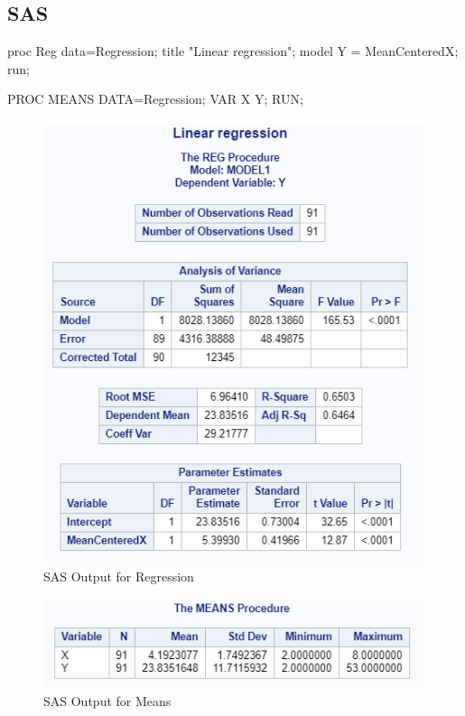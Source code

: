\documentclass[
]{book}
\newenvironment{Shaded}{\begin{snugshade}}{\end{snugshade}}
\newcommand{\NormalTok}[1]{#1}
\newcommand{\StringTok}[1]{\textcolor[rgb]{0.31,0.60,0.02}{#1}}
\begin{document}
\hypertarget{sas-1}{%
\subsection{SAS}\label{sas-1}}

\begin{Shaded}
\begin{Highlighting}[]
\NormalTok{proc Reg data=Regression;}
\NormalTok{title }\StringTok{"Linear regression"}\NormalTok{;}
\NormalTok{model Y =}\StringTok{ }\NormalTok{MeanCenteredX;}
\NormalTok{run;}
	
\NormalTok{PROC MEANS DATA=Regression;}
\NormalTok{  VAR X Y;}
\NormalTok{RUN;}
\end{Highlighting}
\end{Shaded}

\begin{figure}[!h]
\includegraphics{Screenshots/Regression/RegressionSAS} \caption{\label{fig:RegressionSAS}SAS Output for Regression}\label{fig:RegressionSAS}
\end{figure}

\begin{figure}[!h]
\includegraphics{Screenshots/Regression/RegressionSASmeans} \caption{\label{fig:RegressionSASmeans}SAS Output for Means}\label{fig:RegressionSASmeans}
\end{figure}
\end{document}
